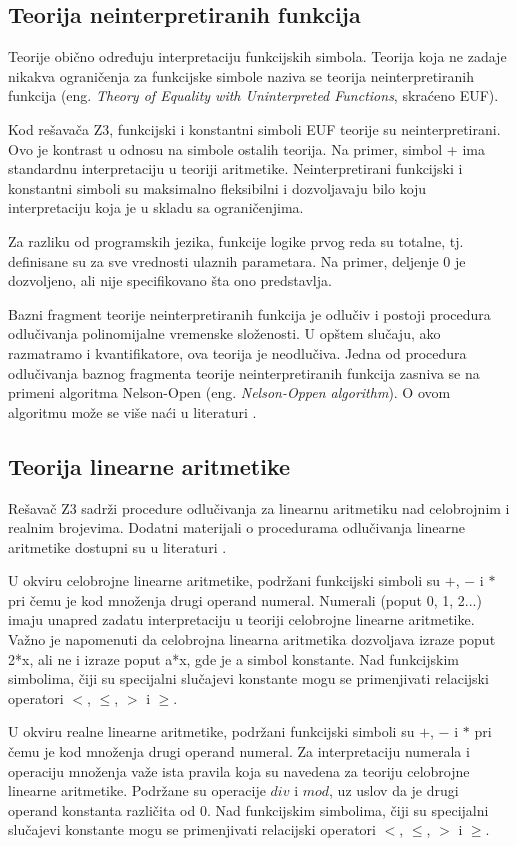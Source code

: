 \documentclass[12pt,oneside]{memoir}
\begin{document}
\subsection{Teorija neinterpretiranih funkcija}
Teorije obično određuju interpretaciju funkcijskih simbola. Teorija koja ne zadaje nikakva ograničenja za funkcijske simbole naziva se teorija neinterpretiranih funkcija 
(eng. \textit{Theory of Equality with Uninterpreted Functions}, skraćeno EUF). \par 
Kod rešavača Z3, funkcijski i konstantni simboli EUF teorije su neinterpretirani. Ovo je kontrast u odnosu na simbole ostalih teorija. Na primer, simbol + ima standardnu interpretaciju u teoriji aritmetike. Neinterpretirani funkcijski i konstantni simboli su maksimalno fleksibilni i dozvoljavaju bilo koju interpretaciju koja je u skladu sa ograničenjima. \par
Za razliku od programskih jezika, funkcije logike prvog reda su totalne, tj. definisane su za sve vrednosti ulaznih parametara. Na primer, deljenje 0 je dozvoljeno, ali nije specifikovano šta ono predstavlja. 
\par
Bazni fragment teorije neinterpretiranih funkcija je odlučiv i postoji procedura odlučivanja polinomijalne vremenske složenosti. U opštem slučaju, ako razmatramo i kvantifikatore, ova teorija je neodlučiva. Jedna od procedura odlučivanja baznog fragmenta teorije neinterpretiranih funkcija zasniva se na primeni algoritma Nelson-Open (eng. \textit{Nelson-Oppen algorithm}). O ovom algoritmu može se više naći u literaturi \cite{NelsonOpen}.
\subsection{Teorija linearne aritmetike} 

Rešavač Z3 sadrži procedure odlučivanja za linearnu aritmetiku nad celobrojnim i realnim brojevima. Dodatni materijali o procedurama odlučivanja linearne aritmetike dostupni su u literaturi \cite{FastLinearArithmetic}.
\par

U okviru celobrojne linearne aritmetike, podržani funkcijski simboli su $+$, $-$ i $*$ pri čemu je kod množenja drugi operand numeral. Numerali (poput 0, 1, 2...) imaju unapred zadatu interpretaciju u teoriji celobrojne linearne aritmetike. Važno je napomenuti da celobrojna linearna aritmetika dozvoljava izraze poput 2*x, ali ne i izraze poput a*x, gde je a simbol konstante. Nad funkcijskim simbolima, čiji su specijalni slučajevi konstante mogu se primenjivati relacijski operatori $<$, $\leq$, $>$ i $\geq$. 
\par
U okviru realne linearne aritmetike, podržani funkcijski simboli su $+$, $-$ i $*$ pri čemu je kod množenja drugi operand numeral. Za interpretaciju numerala i operaciju množenja važe ista pravila koja su navedena za teoriju celobrojne linearne aritmetike. Podržane su operacije $div$ i $mod$, uz uslov da je drugi operand konstanta različita od 0. Nad funkcijskim simbolima, čiji su specijalni slučajevi konstante mogu se primenjivati relacijski operatori $<$, $\leq$, $>$ i $\geq$. 
\par
\end{document}
